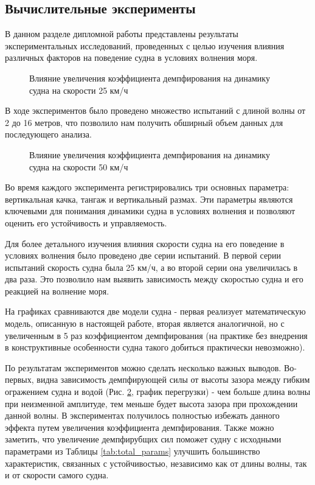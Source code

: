 \begin{centering}
    \subsection{Вычислительные эксперименты}
\end{centering}

В данном разделе дипломной работы представлены результаты экспериментальных исследований, проведенных с целью изучения влияния различных факторов на поведение судна в условиях волнения моря. 

\begin{figure}[!hb]
    \centering
    
    \caption{Влияние увеличения коэффициента демпфирования на динамику судна на скорости 25 км/ч}\label{fig:plots_25}
\end{figure}

В ходе экспериментов было проведено множество испытаний с длиной волны от 2 до 16 метров, что позволило нам получить обширный объем данных для последующего анализа.
\begin{figure}[!hb]
    \centering
    
    \caption{Влияние увеличения коэффициента демпфирования на динамику судна на скорости 50 км/ч}\label{fig:plots_50}
\end{figure}

Во время каждого эксперимента регистрировались три основных параметра: вертикальная качка, тангаж и вертикальный размах. Эти параметры являются ключевыми для понимания динамики судна в условиях волнения и позволяют оценить его устойчивость и управляемость.

Для более детального изучения влияния скорости судна на его поведение в условиях волнения было проведено две серии испытаний. В первой серии испытаний скорость судна была 25 км/ч, а во второй серии она увеличилась в два раза. Это позволило нам выявить зависимость между скоростью судна и его реакцией на волнение моря.

На графиках сравниваются две модели судна - первая реализует математическую модель, описанную в настоящей работе, вторая является аналогичной, но с увеличенным в 5 раз коэффициентом демпфирования (на практике без внедрения в конструктивные особенности судна такого добиться практически невозможно).

По результатам экспериментов можно сделать несколько важных выводов. Во-первых, видна зависимость демпфирующей силы от высоты зазора между гибким огражением судна и водой (Рис. \ref{fig:plots_50}, график перегрузки) - чем больше длина волны при неизменной амплитуде, тем меньше будет высота зазора при прохождении данной волны. В экспериментах получилось полностью избежать данного эффекта путем увеличения коэффициента демпфирования. Также можно заметить, что увеличение демпфирубщих сил поможет судну с исходными параметрами из Таблицы \ref{tab:total_params} улучшить большинство характеристик, связанных с устойчивостью, независимо как от длины волны, так и от скорости самого судна.

